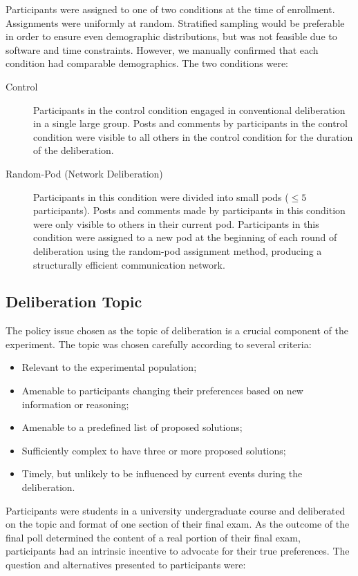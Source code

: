 Participants were assigned to one of two conditions at the time of enrollment.
Assignments were uniformly at random.
Stratified sampling would be preferable in order to ensure even demographic distributions, but was not feasible due to software and time constraints.
However, we manually confirmed that each condition had comparable demographics.
The two conditions were:
\begin{description}
\item[Control]{
Participants in the control condition engaged in conventional deliberation in a single large group.
Posts and comments by participants in the control condition were visible
to all others in the control condition for the duration of the deliberation.}
\item[Random-Pod (Network Deliberation)]{
Participants in this condition were divided into small pods ($\leq 5$ participants).
Posts and comments made by participants in this condition were only visible to others in their current pod.
Participants in this condition were assigned to a new pod at the beginning of each round of deliberation using the random-pod assignment method, producing a structurally efficient communication network.}
\end{description}


\subsection{Deliberation Topic}
The policy issue chosen as the topic of deliberation is a crucial component
of the experiment.
The topic was chosen carefully according to several criteria:
\begin{itemize}
\item Relevant to the experimental population;
\item Amenable to participants changing their preferences based on new information or reasoning;
\item Amenable to a predefined list of proposed solutions;
\item Sufficiently complex to have three or more proposed solutions;
\item Timely, but unlikely to be influenced by current events during the deliberation.
\end{itemize}

Participants were students in a university undergraduate course and deliberated on the topic and format of one section of their final exam.
As the outcome of the final poll determined the content of a real portion of their final exam, participants had an intrinsic incentive to advocate for their true preferences.
The question and alternatives presented to participants were:

